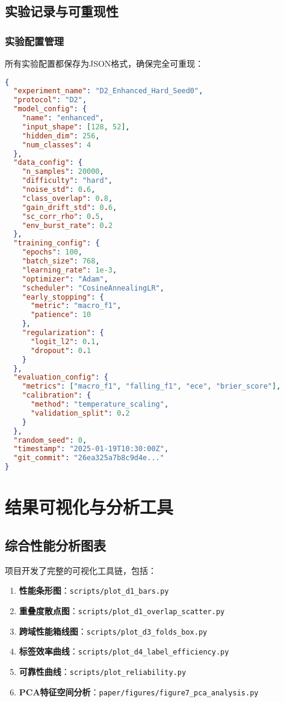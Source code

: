 \subsection{实验记录与可重现性}
\label{subsec:reproducibility}

\subsubsection{实验配置管理}
所有实验配置都保存为JSON格式，确保完全可重现：

\begin{lstlisting}[language=json,caption=实验配置示例]
{
  "experiment_name": "D2_Enhanced_Hard_Seed0",
  "protocol": "D2",
  "model_config": {
    "name": "enhanced",
    "input_shape": [128, 52],
    "hidden_dim": 256,
    "num_classes": 4
  },
  "data_config": {
    "n_samples": 20000,
    "difficulty": "hard",
    "noise_std": 0.6,
    "class_overlap": 0.8,
    "gain_drift_std": 0.6,
    "sc_corr_rho": 0.5,
    "env_burst_rate": 0.2
  },
  "training_config": {
    "epochs": 100,
    "batch_size": 768,
    "learning_rate": 1e-3,
    "optimizer": "Adam",
    "scheduler": "CosineAnnealingLR",
    "early_stopping": {
      "metric": "macro_f1",
      "patience": 10
    },
    "regularization": {
      "logit_l2": 0.1,
      "dropout": 0.1
    }
  },
  "evaluation_config": {
    "metrics": ["macro_f1", "falling_f1", "ece", "brier_score"],
    "calibration": {
      "method": "temperature_scaling",
      "validation_split": 0.2
    }
  },
  "random_seed": 0,
  "timestamp": "2025-01-19T10:30:00Z",
  "git_commit": "26ea325a7b8c9d4e..."
}
\end{lstlisting}

\section{结果可视化与分析工具}
\label{sec:visualization}

\subsection{综合性能分析图表}
\label{subsec:performance_visualization}

项目开发了完整的可视化工具链，包括：

\begin{enumerate}
\item \textbf{性能条形图}：\texttt{scripts/plot\_d1\_bars.py}
\item \textbf{重叠度散点图}：\texttt{scripts/plot\_d1\_overlap\_scatter.py}
\item \textbf{跨域性能箱线图}：\texttt{scripts/plot\_d3\_folds\_box.py}
\item \textbf{标签效率曲线}：\texttt{scripts/plot\_d4\_label\_efficiency.py}
\item \textbf{可靠性曲线}：\texttt{scripts/plot\_reliability.py}
\item \textbf{PCA特征空间分析}：\texttt{paper/figures/figure7\_pca\_analysis.py}
\end{enumerate}

